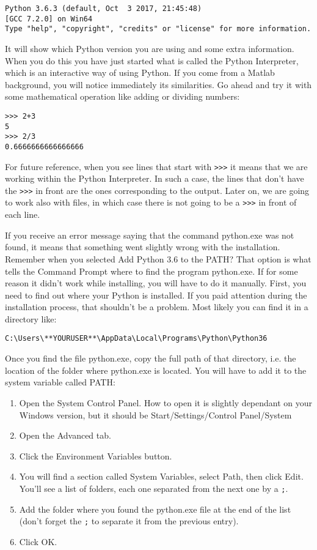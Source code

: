 \begin{verbatim}
Python 3.6.3 (default, Oct  3 2017, 21:45:48)
[GCC 7.2.0] on Win64
Type "help", "copyright", "credits" or "license" for more information.
\end{verbatim}

It will show which Python version you are using and some extra information. When you do this you have just started what is called the Python Interpreter, which is an interactive way of using Python. If you come from a Matlab background, you will notice immediately its similarities. Go ahead and try it with some mathematical operation like adding or dividing numbers:

\begin{verbatim}
>>> 2+3
5
>>> 2/3
0.6666666666666666
\end{verbatim}

For future reference, when you see lines that start with \texttt{>>>} it means that we are working within the Python Interpreter. In such a case, the lines that don’t have the \texttt{>>>} in front are the ones corresponding to the output. Later on, we are going to work also with files, in which case there is not going to be a \texttt{>>>} in front of each line.

If you receive an error message saying that the command python.exe was not found, it means that something went slightly wrong with the installation. Remember when you selected Add Python 3.6 to the PATH? That option is what tells the Command Prompt where to find the program python.exe. If for some reason it didn’t work while installing, you will have to do it manually. First, you need to find out where your Python is installed. If you paid attention during the installation process, that shouldn’t be a problem. Most likely you can find it in a directory like:

\begin{verbatim}
C:\Users\**YOURUSER**\AppData\Local\Programs\Python\Python36
\end{verbatim}

Once you find the file python.exe, copy the full path of that directory, i.e. the location of the folder where python.exe is located. You will have to add it to the system variable called PATH:

\begin{enumerate}
 \item Open the System Control Panel. How to open it is slightly dependant on your Windows version, but it should be Start/Settings/Control Panel/System
 \item Open the Advanced tab.
 \item Click the Environment Variables button.
 \item You will find a section called System Variables, select Path, then click Edit. You’ll see a list of folders, each one separated from the next one by a \texttt{;}.
 \item Add the folder where you found the python.exe file at the end of the list (don’t forget the \texttt{;} to separate it from the previous entry). 
\item Click OK.
\end{enumerate}

